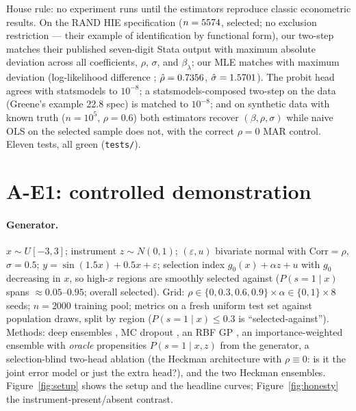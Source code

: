 \documentclass[10pt]{article}
\newcommand{\IMR}{\lambda}
\begin{document}
House rule: no experiment runs until the estimators reproduce classic
econometric results. On the \citet{cameron2005} RAND HIE specification
($n = 5574$, \EZeroNSel{} selected; no exclusion restriction ---
their example of identification by functional form), our two-step matches
their published seven-digit Stata output with maximum absolute deviation
\EZeroDevTS{} across all coefficients, $\rho$, $\sigma$, and
$\beta_\IMR$; our MLE matches with maximum deviation \EZeroDevMLE{}
(log-likelihood difference \EZeroLLDev{}; $\hat\rho = 0.7356$,
$\hat\sigma = 1.5701$). The probit head agrees with statsmodels
to $10^{-8}$; a statsmodels-composed two-step on the \citet{mroz1987}
data (Greene's example 22.8 spec) is matched to $10^{-8}$; and on
synthetic data with known truth ($n = 10^5$, $\rho = 0.6$) both
estimators recover $(\beta, \rho, \sigma)$ while naive OLS on the
selected sample does not, with the correct $\rho = 0$ MAR control.
Eleven tests, all green (\texttt{tests/}).

\section{A-E1: controlled demonstration}
\label{sec:e1}

\paragraph{Generator.} $x \sim U[-3,3]$; instrument $z \sim N(0,1)$;
$(\varepsilon, u)$ bivariate normal with $\mathrm{Corr} = \rho$, $\sigma
= 0.5$; $y = \sin(1.5x) + 0.5x + \varepsilon$; selection index $g_0(x) +
\alpha z + u$ with $g_0$ decreasing in $x$, so high-$x$ regions are
smoothly selected against ($P(s{=}1\mid x)$ spans $\approx 0.05$--$0.95$;
overall \EOneSelFrac{} selected). Grid: $\rho \in \{0, 0.3, 0.6, 0.9\}
\times \alpha \in \{0, 1\} \times 8$ seeds; $n = 2000$ training pool;
metrics on a fresh uniform test set against population draws, split by
region ($P(s{=}1 \mid x) \le 0.3$ is ``selected-against''). Methods: deep
ensembles \citep{lakshminarayanan2017}, MC dropout \citep{gal2016}, an
RBF GP \citep{rasmussen2006}, an importance-weighted ensemble with
\emph{oracle} propensities $P(s{=}1 \mid x, z)$ from the generator, a
selection-blind two-head ablation (the Heckman architecture with $\rho
\equiv 0$: is it the joint error model or just the extra head?), and the
two Heckman ensembles. Figure~\ref{fig:setup} shows the setup and the
headline curves; Figure~\ref{fig:honesty} the instrument-present/absent
contrast.
\end{document}
